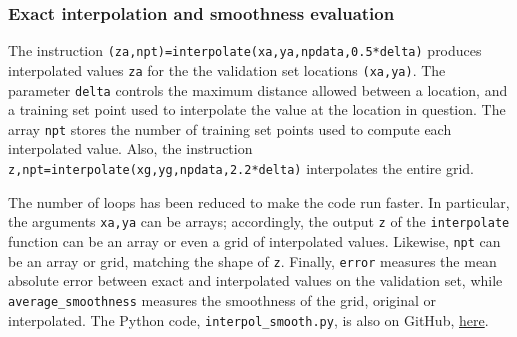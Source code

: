 \documentclass[oneside,10pt]{book}
\begin{document}
\subsubsection{Exact interpolation and smoothness evaluation}\label{uycdk77kuw}

The instruction \texttt{(za,npt)=interpolate(xa,ya,npdata,0.5*delta)} produces interpolated values \texttt{za} for the the validation set locations \texttt{(xa,ya)}.
The parameter \texttt{delta} controls the maximum
 distance allowed between a location, and a training set point used to interpolate the value at the location in question.
 The array \texttt{npt} stores the number of training set points used to compute each interpolated value. 
Also, the instruction  \texttt{z,npt=interpolate(xg,yg,npdata,2.2*delta)}
 interpolates the  entire grid. 

The number of loops has been reduced to make the code run faster. In particular, the arguments
 \texttt{xa,ya} can be arrays; accordingly, the output \texttt{z} of the \texttt{interpolate} function can be an array or even a grid of
 interpolated values. Likewise, \texttt{npt} can be an array or grid, matching the shape of \texttt{z}. Finally, 
 \texttt{error} measures the mean absolute error between exact and interpolated values on the validation set,
  while \texttt{average\_smoothness} measures the smoothness of the grid, original or interpolated.
The Python code, \texttt{interpol\_smooth.py}, is also on GitHub, 
 \href{https://github.com/VincentGranville/Statistical-Optimization/blob/main/interpol_smooth.py}{here}.\vspace{1ex}
\end{document}
